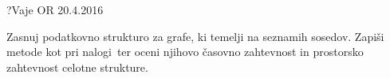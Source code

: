 \begin{naloga}{?}{Vaje OR 20.4.2016}
\begin{vprasanje}
Zasnuj podatkovno strukturo za grafe,
ki temelji na seznamih sosedov.
Zapiši metode kot pri nalogi~\nal[matgraf]
ter oceni njihovo časovno zahtevnost
in prostorsko zahtevnost celotne strukture.
\end{vprasanje}
\begin{odgovor}
\end{odgovor}
\end{naloga}
